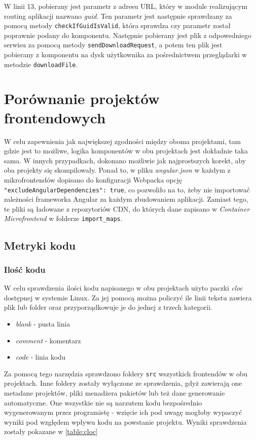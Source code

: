 \documentclass{SGGW-thesis}
\begin{document}
  W linii 13, pobierany jest parametr z adresu URL, który w module realizującym routing aplikacji nazwano \textit{guid}. Ten parametr jest następnie sprawdzany za pomocą metody \lstinline{checkIfGuidIsValid}, która sprawdza czy parametr został poprawnie podany do komponentu. Następnie pobierany jest plik z odpowedniego serwisu za pomocą metody \lstinline{sendDownloadRequest}, a potem ten plik jest pobierany z komponentu na dysk użytkownika za pośrednictwem przeglądarki w metodzie \lstinline{downloadFile}.

\chapter{Porównanie projektów frontendowych}
  W celu zapewnienia jak największej zgodności między oboma projektami, tam gdzie jest to możliwe, logika komponentów w obu projektach jest dokładnie taka sama. W innych przypadkach, dokonano możliwie jak najprostszych korekt, aby oba projekty się skompilowały. Ponad to, w pliku \textit{angular.json} w każdym z mikrofrontendów dopisano do konfiguracji Webpacka opcję \lstinline{"excludeAngularDependencies": true}, co pozwoliło na to, żeby nie importować zależności frameworka Angular za każdym zbudowaniem aplikacji. Zamiast tego, te pliki są ładowane z repozytoriów CDN, do których dane zapisano w \textit{Container Microfrontend} w folderze \lstinline{import_maps}.

  \section{Metryki kodu}
    \subsection{Ilość kodu}
    W celu sprawdzenia ilości kodu napisanego w obu projektach użyto paczki \textit{cloc} dostępnej w systemie Linux. Za jej pomocą można policzyć ile linii tekstu zawiera plik lub folder oraz przyporządkowuje je do jednej z trzech kategorii.

    \begin{itemize}
      \item \textit{blank} - pusta linia
      \item \textit{comment} - komentarz
      \item \textit{code} - linia kodu
    \end{itemize}

    Za pomocą tego narzędzia sprawdzono foldery \lstinline{src} wszystkich frontendów w obu projektach. Inne foldery zostały wyłączone ze sprawdzenia, gdyż zawierają one metadane projektów, pliki menadżera pakietów lub też dane generowanie automatyczne. One wszystkie nie są narzutem kodu bezpośrednio wygenerowanym przez programistę - wzięcie ich pod uwagę mogłoby wypaczyć wyniki pod względem wpływu kodu na powstanie projektu. Wyniki sprawdzenia zostały pokazane w \cref{table:cloc}
\end{document}
